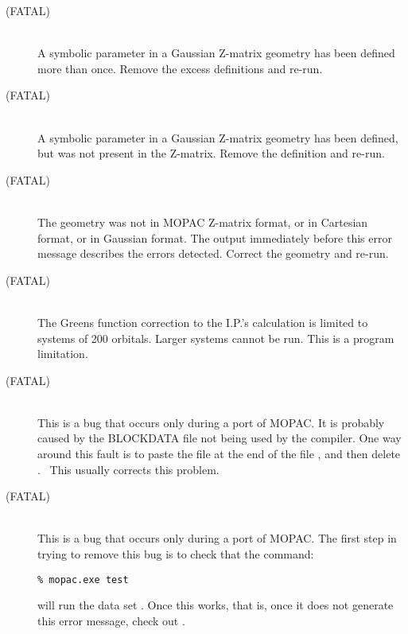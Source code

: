 \begin{description}
\item[ (FATAL)]~\\
A symbolic parameter in a Gaussian Z-matrix geometry has been defined
more than once.  Remove the excess definitions and re-run.

\item[ (FATAL)]~\\
A symbolic parameter in a Gaussian Z-matrix geometry has been defined,
but was not present in the Z-matrix.  Remove the definition and re-run.

\item[ (FATAL)]~\\
The geometry was not in MOPAC Z-matrix format, or in Cartesian format,
or in Gaussian format.  The output immediately before this error message
describes the errors detected.  Correct the geometry and re-run.
 
\item[ (FATAL)]~\\
The  Greens function correction to the I.P.'s calculation is limited to
systems of 200 orbitals.  Larger systems cannot be run.  This is a program 
limitation.
 
\item[ (FATAL)]~\\
This is a bug that occurs only during a port of MOPAC. It is probably caused by
the BLOCKDATA file not being used by the compiler.  One way around this
fault is to paste the file  at the end of the file ,
and then delete . \ This usually corrects this problem.

\item[ (FATAL)]~\\
This is a bug that occurs only during a port of MOPAC. The first step in
trying to remove this bug is to check that the command:
\begin{verbatim}
% mopac.exe test
\end{verbatim}
will run the data set .  Once this works, that is, once it
does not generate this error message, check out .


\end{description}
